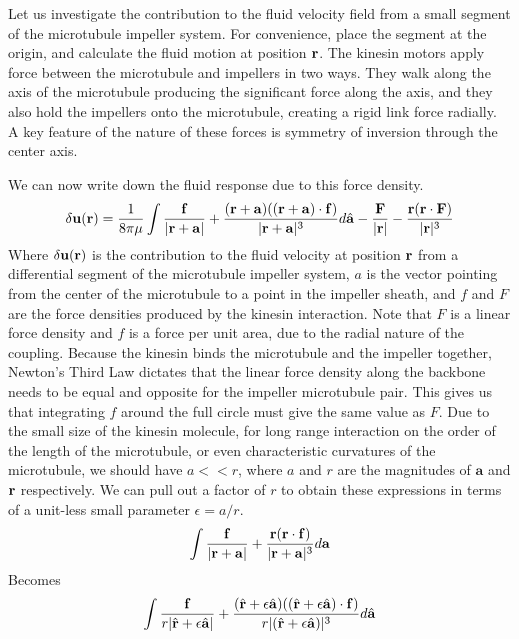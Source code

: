 \documentclass[11pt]{ucthesis}
\def\br{{\bf r}}
\begin{document}
Let us investigate the contribution to the fluid velocity field from a small segment of the microtubule impeller system. For convenience, place the segment at the origin, and calculate the fluid motion at position $\br$. The kinesin motors apply force between the microtubule and impellers in two ways. They walk along the axis of the microtubule producing the significant force along the axis, and they also hold the impellers onto the microtubule, creating a rigid link force radially. A key feature of the nature of these forces is symmetry of inversion through the center axis.

We can now write down the fluid response due to this force density.
\begin{equation}
\label{eq:forcedensitystart}
\delta \mathbf{u}(\br) = \frac{1}{8\pi\mu}\int \frac{ \mathbf{f}}{|\br +  \mathbf{a}|} + \frac{(\br+ \mathbf{a}) ((\br +  \mathbf{a}) \cdot  \mathbf{f})}{|\br +  \mathbf{a}|^3} d\hat{ \mathbf{a}} - \frac{ \mathbf{F}}{|\br|} - \frac{\br (\br \cdot  \mathbf{F})}{|\br|^3}
\end{equation}
Where $\delta  \mathbf{u}(\br)$ is the contribution to the fluid velocity at position $\br$ from a differential segment of the microtubule impeller system, $a$ is the vector pointing from the center of the microtubule to a point in the impeller sheath, and $f$ and $F$ are the force densities produced by the kinesin interaction. Note that $F$ is a linear force density and $f$ is a force per unit area, due to the radial nature of the coupling.
Because the kinesin binds the microtubule and the impeller together, Newton's Third Law dictates that the linear force density along the backbone needs to be equal and opposite for the impeller microtubule pair. This gives us that integrating $f$ around the full circle must give the same value as $F$.
Due to the small size of the kinesin molecule, for long range interaction on the order of the length of the microtubule, or even characteristic curvatures of the microtubule, we should have $a << r$, where $a$ and $r$ are the magnitudes of $ \mathbf{a}$ and $\br$ respectively. We can pull out a factor of $r$ to obtain these expressions in terms of a unit-less small parameter $\epsilon = a/r$.
\begin{equation}
\label{eq:forcedensitycircleonly}
\int \frac{ \mathbf{f}}{|\br +  \mathbf{a}|} + \frac{\br (\br \cdot  \mathbf{f})}{|\br +  \mathbf{a}|^3} d \mathbf{a}
\end{equation}
Becomes
\begin{equation}
\label{eq:forcedensityepsilon}
\int \frac{\bf f}{r|\hat{\br} + \epsilon \hat{ \mathbf{a}}|} + \frac{(\hat{\br} + \epsilon \hat{ \mathbf{a}}) ((\hat{\br} + \epsilon \hat{ \mathbf{a}}) \cdot  \mathbf{f})}{r|(\hat{\br} + \epsilon \hat{ \mathbf{a}})|^3} d\hat{ \mathbf{a}}
\end{equation}
\end{document}
